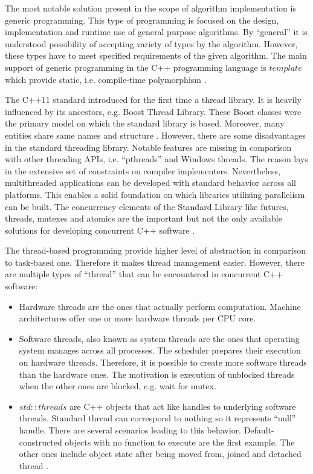 The most notable solution present in the scope of algorithm implementation is generic programming.
This type of programming is focused on the design, implementation and runtime use of general purpose
algorithms. By ``general'' it is understood possibility of accepting variety of types by the algorithm.
However, these types have to meet specified requirements of the given algorithm. The main support
of generic programming in the C++ programming language is $template$ which provide static,
i.e. compile-time polymorphism \cite{cpp_language_bjarne}.

The C++11 standard introduced for the first time a thread library. It is heavily
influenced by its ancestors, e.g. Boost Thread Library. These Boost classes were the primary model
on which the standard library is based. Moreover, many entities share same names and structure \cite{cpp_concurrency}.
However, there are some disadvantages in the standard threading library. Notable features are
missing in comparison with other threading APIs, i.e. ``pthreads'' and Windows threads.
The reason lays in the extensive set of constraints on compiler implementers. Nevertheless,
multithreaded applications can be developed with standard behavior across all platforms.
This enables a solid foundation on which libraries utilizing parallelism can be built.
The concurrency elements of the Standard Library like futures, threads, mutexes and atomics
are the important but not the only available solutions for developing concurrent C++ software \cite{cpp_meyers}.

The thread-based programming provide higher level of abstraction in comparison to task-based one.
Therefore it makes thread management easier. However, there are multiple types of ``thread''
that can be encountered in concurrent C++ software:
\begin{itemize}
    \item Hardware threads are the ones that actually perform computation. Machine architectures
    offer one or more hardware threads per CPU core.
    \item Software threads, also known as system threads are the ones that operating system manages
    across all processes. The scheduler prepares their execution on hardware threads. Therefore, it
    is possible to create more software threads than the hardware ones. The motivation is execution
    of unblocked threads when the other ones are blocked, e.g. wait for mutex.
    \item $std::threads$ are C++ objects that act like handles to underlying software threads.
    Standard thread can correspond to nothing so it represents ``null'' handle. There are several scenarios
    leading to this behavior. Default-constructed objects with no function to execute are the first
    example. The other ones include object state after being moved from, joined and detached thread \cite{cpp_meyers}.
\end{itemize}

